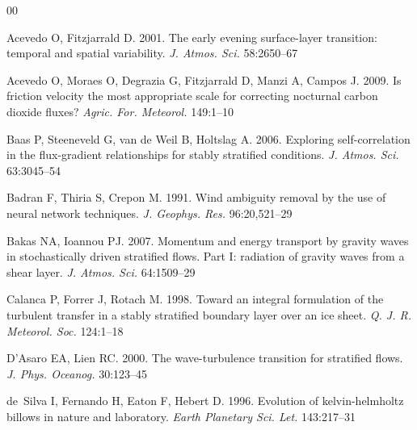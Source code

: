 \documentclass[letterpaper]{ar-1col}
\begin{document}
\begin{thebibliography}{00}

Acevedo O, Fitzjarrald D. 2001.
The early evening surface-layer transition: temporal and spatial variability.
\textit{J. Atmos. Sci.} 58:2650--67

Acevedo O, Moraes O, Degrazia G, Fitzjarrald D, Manzi A, Campos J. 2009.
Is friction velocity the most appropriate scale for correcting nocturnal carbon
  dioxide fluxes?
\textit{Agric. For. Meteorol.} 149:1--10

Baas P, Steeneveld G, {van de Weil} B, Holtslag A. 2006.
Exploring self-correlation in the flux-gradient relationships for stably
  stratified conditions.
\textit{J. Atmos. Sci.} 63:3045--54

Badran F, Thiria S, Crepon M. 1991.
Wind ambiguity removal by the use of neural network techniques.
\textit{J. Geophys. Res.} 96:20,521--29

Bakas NA, Ioannou PJ. 2007.
Momentum and energy transport by gravity waves in stochastically driven
  stratified flows. {Part I}: radiation of gravity waves from a shear layer.
\textit{J. Atmos. Sci.} 64:1509--29

Calanca P, Forrer J, Rotach M. 1998.
Toward an integral formulation of the turbulent transfer in a stably stratified
  boundary layer over an ice sheet.
\textit{Q. J. R. Meteorol. Soc.} 124:1--18

D'Asaro EA, Lien RC. 2000.
The wave-turbulence transition for stratified flows.
\textit{J. Phys. Oceanog.} 30:123--45

de~Silva I, Fernando H, Eaton F, Hebert D. 1996.
Evolution of kelvin-helmholtz billows in nature and laboratory.
\textit{Earth Planetary Sci. Let.} 143:217--31



\end{thebibliography}
\end{document}
